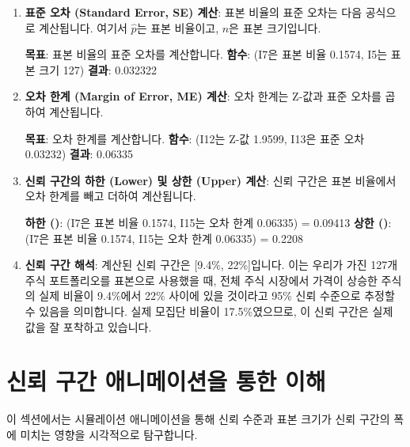 \documentclass[11pt,a4paper]{article}
\begin{document}
\begin{enumerate}
    \item \textbf{표준 오차 (Standard Error, SE) 계산}:
    표본 비율의 표준 오차는 다음 공식으로 계산됩니다.
    여기서 $\hat{p}$는 표본 비율이고, $n$은 표본 크기입니다.
    \begin{tcolorbox}[title=Excel SQRT 함수를 이용한 표준 오차 계산, mybox]
        \textbf{목표}: 표본 비율의 표준 오차를 계산합니다.
        \textbf{함수}:  (I7은 표본 비율 0.1574, I5는 표본 크기 127)
        \textbf{결과}: 0.032322
    \end{tcolorbox}

    \item \textbf{오차 한계 (Margin of Error, ME) 계산}:
    오차 한계는 Z-값과 표준 오차를 곱하여 계산됩니다.
    \begin{tcolorbox}[title=Excel 오차 한계 계산, mybox]
        \textbf{목표}: 오차 한계를 계산합니다.
        \textbf{함수}:  (I12는 Z-값 1.9599, I13은 표준 오차 0.03232)
        \textbf{결과}: 0.06335
    \end{tcolorbox}

    \item \textbf{신뢰 구간의 하한 (Lower) 및 상한 (Upper) 계산}:
    신뢰 구간은 표본 비율에서 오차 한계를 빼고 더하여 계산됩니다.
    \begin{tcolorbox}[title=Excel 신뢰 구간 계산, mybox]
        \textbf{하한 ()}:  (I7은 표본 비율 0.1574, I15는 오차 한계 0.06335) = 0.09413
        \textbf{상한 ()}:  (I7은 표본 비율 0.1574, I15는 오차 한계 0.06335) = 0.2208
    \end{tcolorbox}

    \item \textbf{신뢰 구간 해석}:
    계산된 신뢰 구간은 [9.4\%, 22\%]입니다. 이는 우리가 가진 127개 주식 포트폴리오를 표본으로 사용했을 때, 전체 주식 시장에서 가격이 상승한 주식의 실제 비율이 9.4\%에서 22\% 사이에 있을 것이라고 95\% 신뢰 수준으로 추정할 수 있음을 의미합니다. 실제 모집단 비율이 17.5\%였으므로, 이 신뢰 구간은 실제 값을 잘 포착하고 있습니다.
\end{enumerate}

\newpage
\section{신뢰 구간 애니메이션을 통한 이해}
이 섹션에서는 시뮬레이션 애니메이션을 통해 신뢰 수준과 표본 크기가 신뢰 구간의 폭에 미치는 영향을 시각적으로 탐구합니다.
\end{document}
